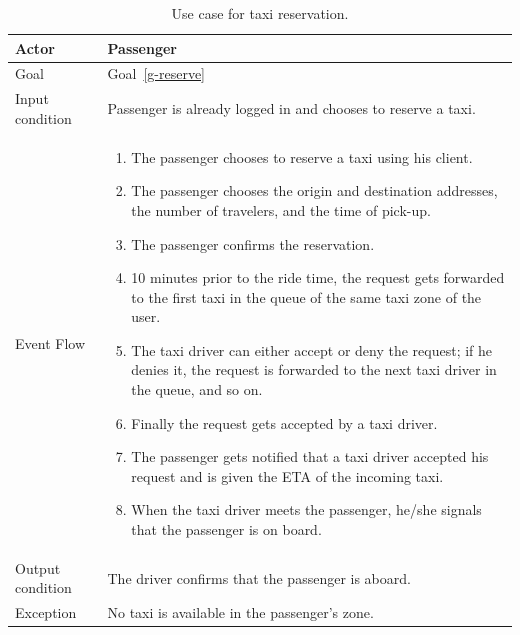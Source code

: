 \begin{table}
\begin{center}
\begin{tabular}{| l | p{} |}
\hline
Actor & Passenger \\
\hline
Goal & Goal~\ref{g-reserve}
\\
\hline
Input condition & Passenger is already logged in and chooses to reserve a taxi.  \\
\hline
Event Flow & \begin{enumerate}
	\item The passenger chooses to reserve a taxi using his client.
	\item The passenger chooses the origin and destination addresses, the number of travelers, and the time of pick-up.
	\item The passenger confirms the reservation.
	\item 10 minutes prior to the ride time, the request gets forwarded to the first taxi in the queue of the same taxi zone of the user.
	\item The taxi driver can either accept or deny the request; if he denies it, the request is forwarded to the next taxi driver in the queue, and so on.
	\item Finally the request gets accepted by a taxi driver.
	\item The passenger gets notified that a taxi driver accepted his request and is given the ETA of the incoming taxi.
	\item When the taxi driver meets the passenger, he/she signals that the passenger is on board.
\end{enumerate}
\\
\hline
Output condition & The driver confirms that the passenger is aboard. \\
\hline
Exception & No taxi is available in the passenger's zone. \\
\hline
\end{tabular}
\end{center}
\caption{Use case for taxi reservation.}
\label{usecase-reservation}
\end{table}

